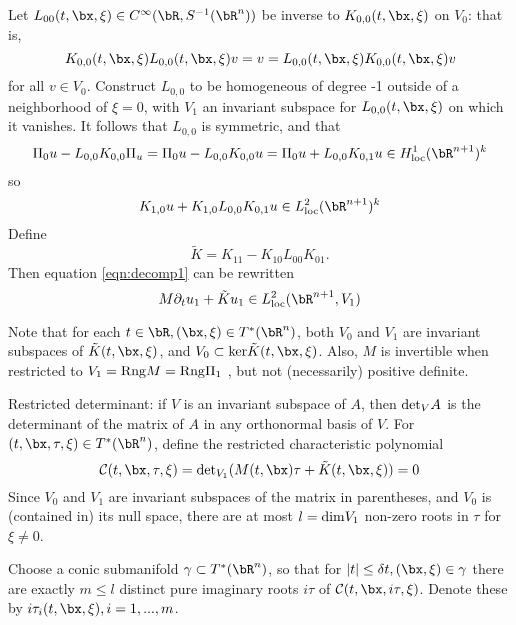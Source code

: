 Let  $L_{00}(t,\bx,\xi) \in C^{\infty}(\bR, S^{-1}(\bR^n))$ be inverse to $K_{0,0}(t,\bx,\xi)$ on $V_0$: that is,
\[
  K_{0,0}(t,\bx,\xi)L_{0,0}(t,\bx,\xi) v=v=L_{0,0}(t,\bx,\xi)K_{0,0}(t,\bx,\xi)v
\]
for all $v \in V_0$. Construct $L_{0,0}$ to be homogeneous of degree -1 outside of a neighborhood of $\xi=0$, with $V_1$ an invariant subspace for $L_{0,0}(t,\bx,\xi)$ on which it vanishes. It follows that $L_{0,0}$ is symmetric, and that
\[
  \Pi_0 u - L_{0,0}K_{0,0}\Pi_u = \Pi_0 u - L_{0,0}K_{0,0}u = \Pi_0 u + L_{0,0}K_{0,1}u \in H^{1}_{\rm loc}(\bR^{n+1})^k
\]
so
\[
  K_{1,0}u + K_{1,0}L_{0,0}K_{0,1}u \in L^2 _{\rm loc}(\bR^{n+1})^k
\]
Define
\[
  \tilde{K} = K_{11} - K_{10}L_{00}K_{01}.
\]
Then equation \ref{eqn:decomp1} can be rewritten
\begin{equation}
  \label{eqn:shs1}
  M\partial_t u_1 + \tilde{K}u_1 \in L^2_{\rm loc}(\bR^{n+1},V_1)
\end{equation}

Note that for each $t \in \bR, (\bx,\xi) \in T^*(\bR^n)$, both $V_0$ and $V_1$ are invariant subspaces of $\tilde{K}(t,\bx,\xi)$, and $V_0 \subset {\rm ker}\tilde{K}(t,\bx,\xi)$. Also, $M$ is invertible when restricted to $V_1 = {\rm Rng} M = {\rm Rng } \Pi_1$ , but not (necessarily) positive definite.
  
Restricted determinant: if $V$ is an invariant subspace of $A$, then ${\rm det}_{V} A$ is the determinant of the matrix of $A$ in any orthonormal basis of $V$.
For $(t,\bx,\tau,\xi) \in T^*(\bR^n)$, define the restricted characteristic polynomial
\[
  {\cal C}(t,\bx,\tau,\xi) = {\rm det}_{V_1} (M(t,\bx)\tau + \tilde{K}(t,\bx,\xi) )= 0
\]
Since $V_0$ and $V_1$ are invariant subspaces of the matrix in parentheses, and $V_0$ is (contained in) its null space, there are at most $l={\rm dim}V_1$ non-zero roots in $\tau$ for $\xi \ne 0$.

Choose a conic submanifold $\gamma \subset T^*(\bR^n)$, so that for
$|t| \le \delta t, (\bx,\xi) \in \gamma$ there are exactly $m \le l$
distinct pure imaginary roots $i\tau$ of ${\cal C}(t,\bx,i\tau,\xi)$. Denote these by $i\tau_i(t,\bx,\xi), i=1,...,m$.


